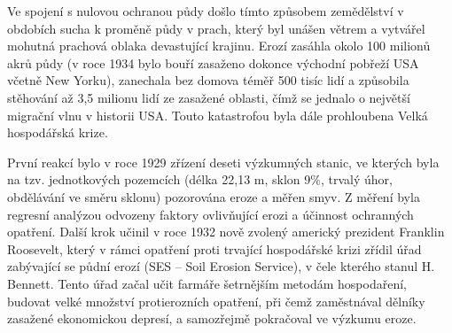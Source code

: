 Ve spojení s nulovou ochranou půdy došlo tímto způsobem zemědělství v
obdobích sucha k proměně půdy v prach, který byl unášen větrem a
vytvářel mohutná prachová oblaka devastující krajinu. Erozí zasáhla
okolo 100 milionů akrů půdy (v roce 1934 bylo bouří zasaženo dokonce
východní pobřeží USA včetně New Yorku), zanechala bez domova téměř 500
tisíc lidí a způsobila stěhování až 3,5 milionu lidí ze zasažené
oblasti, čímž se jednalo o největší migrační vlnu v historii
USA. Touto katastrofou byla dále prohloubena Velká hospodářská krize.

První reakcí bylo v roce 1929 zřízení deseti výzkumných stanic, ve
kterých byla na tzv. jednotkových pozemcích (délka 22,13 m, sklon
9$\%$, trvalý úhor, obdělávání ve směru sklonu) pozorována eroze a
měřen smyv. Z měření byla regresní analýzou odvozeny faktory
ovlivňující erozi a účinnost ochranných opatření. Další krok učinil v
roce 1932 nově zvolený americký prezident Franklin Roosevelt, který v
rámci opatření proti trvající hospodářské krizi zřídil úřad zabývající
se půdní erozí (SES – Soil Erosion Service), v čele kterého stanul
H. Bennett. Tento úřad začal učit farmáře šetrnějším metodám
hospodaření, budovat velké množství protierozních opatření, při čemž
zaměstnával dělníky zasažené ekonomickou depresí, a samozřejmě
pokračoval ve výzkumu eroze.\cite{Bonnifield1979}\cite{Egan2006}

